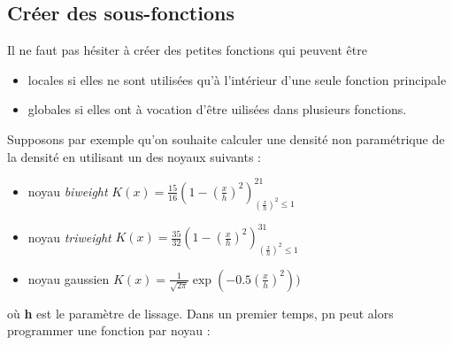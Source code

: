 \documentclass[
]{book}
\theoremstyle{definition}
\theoremstyle{definition}
\theoremstyle{definition}
\theoremstyle{definition}
\theoremstyle{remark}
\begin{document}
\hypertarget{cruxe9er-des-sous-fonctions}{%
\subsection{Créer des sous-fonctions}\label{cruxe9er-des-sous-fonctions}}

Il ne faut pas hésiter à créer des petites fonctions qui peuvent être

\begin{itemize}
\item
  locales si elles ne sont utilisées qu'à l'intérieur d'une seule fonction principale
\item
  globales si elles ont à vocation d'être uilisées dans plusieurs fonctions.
\end{itemize}

Supposons par exemple qu'on souhaite calculer une densité non paramétrique de la densité en utilisant un des noyaux suivants :

\begin{itemize}
\item
  noyau \emph{biweight} \(K(x) = \frac{15}{16}(1-(\frac{x}{h})^2)^21_{(\frac{x}{h})^2\leq 1}\)
\item
  noyau \emph{triweight} \(K(x) = \frac{35}{32}(1-(\frac{x}{h})^2)^31_{(\frac{x}{h})^2\leq 1}\)
\item
  noyau gaussien \(K(x) = \frac{1}{\sqrt{2\pi}}\exp(-0.5(\frac{x}{h})^2))\)
\end{itemize}

où \textbf{h} est le paramètre de lissage. Dans un premier temps, pn peut alors programmer une fonction par noyau :
\end{document}
